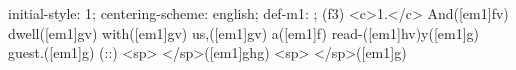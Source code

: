 initial-style: 1;
centering-scheme: english;
def-m1: \grealign;
(f3) <c>1.</c> And([em1]fv) dwell([em1]gv) with([em1]gv) us,([em1]gv) a([em1]f) read-([em1]hv)y([em1]g) guest.([em1]g) (::) <sp> </sp>([em1]ghg) <sp>   </sp>([em1]g)